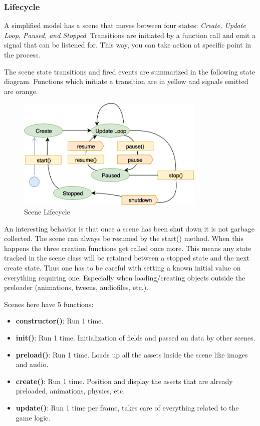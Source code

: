 \subsubsection{Lifecycle}
A simplified model has a scene that moves between four states: \textit{Create, Update Loop, Paused, and Stopped}.
Transitions are initiated by a function call and emit a signal that can be listened for.
This way, you can take action at specific point in the process.

The scene state transitions and fired events are summarized in the following state diagram.
Functions which initiate a transition are in yellow and signals emitted are orange.

\begin{figure}[H]
    \centering
    \includegraphics[width=0.8\textwidth]{figures/lifecycle}
    \caption{Scene Lifecycle\cite{phaser-guides-scenes}}
    \label{fig:lifecycle}
\end{figure}

An interesting behavior is that once a scene has been shut down it is not garbage collected.
The scene can always be resumed by the start() method.
When this happens the three creation functions get called once more.
This means any state tracked in the scene class will be retained between a stopped state and the next create state.
Thus one has to be careful with setting a known initial value on everything requiring one.
Especially when loading/creating objects outside the preloader (animations, tweens, audiofiles, etc.).

Scenes here have 5 functions:

\begin{itemize}
    \item \textbf{constructor()}: Run 1 time.
    \item \textbf{init()}: Run 1 time. Initialization of fields and passed on data by other scenes.
    \item \textbf{preload()}: Run 1 time. Loads up all the assets inside the scene like images and audio.
    \item \textbf{create()}: Run 1 time. Position and display the assets that are already preloaded, animations, physics, etc.
    \item \textbf{update()}: Run 1 time per frame, takes care of everything related to the game logic.
\end{itemize}

